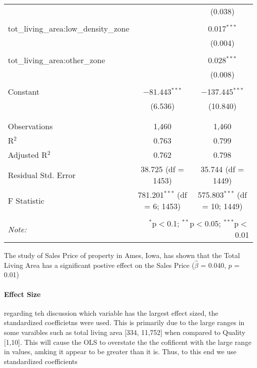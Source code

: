 \documentclass{article}
\begin{document}
\begin{table}[!htbp]
\begin{tabular}{@{\extracolsep{5pt}}lcc}
  &  & (0.038) \\ 
  & & \\ 
 tot\_living\_area:low\_density\_zone &  & 0.017$^{***}$ \\ 
  &  & (0.004) \\ 
  & & \\ 
 tot\_living\_area:other\_zone &  & 0.028$^{***}$ \\ 
  &  & (0.008) \\ 
  & & \\ 
 Constant & $-$81.443$^{***}$ & $-$137.445$^{***}$ \\ 
  & (6.536) & (10.840) \\ 
  & & \\ 
\hline \\[-1.8ex] 
Observations & 1,460 & 1,460 \\ 
R$^{2}$ & 0.763 & 0.799 \\ 
Adjusted R$^{2}$ & 0.762 & 0.798 \\ 
Residual Std. Error & 38.725 (df = 1453) & 35.744 (df = 1449) \\ 
F Statistic & 781.201$^{***}$ (df = 6; 1453) & 575.803$^{***}$ (df = 10; 1449) \\ 
\hline 
\hline \\[-1.8ex] 
\textit{Note:}  & \multicolumn{2}{r}{$^{*}$p$<$0.1; $^{**}$p$<$0.05; $^{***}$p$<$0.01} \\ 
\end{tabular} 
\end{table}


The study of Sales Price of property in Ames, Iowa, has shown that the Total Living Area has a significant postive effect on the Sales Price ($\hat{\beta}$ = 0.040, $p$ = 0.01)

\paragraph{Effect Size} regarding teh discussion which variable has the largest effect sized, the standardized coefficietns were used. This is primarily due to the large ranges in some varaibles such as total living area [334, 11,752] when compared to Quality [1,10]. This will cause the OLS to overstate the the cofificent with the large range in values, amking it appear to be greater than it is. Thus, to this end we use standardized coefficients
\end{document}
